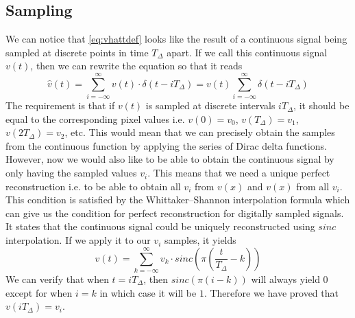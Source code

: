 \documentclass[a4paper,12pt,twoside,openright]{report}
\begin{document}
\subsection{Sampling}
We can notice that \ref{eq:vhattdef} looks like the result of a continuous signal being sampled at discrete points in time $T_{\Delta}$ apart. If we call this continuous signal $v(t)$, then we can rewrite the equation so that it reads
\begin{equation}
\hat{v}(t) = \sum\limits_{i=-\infty}^{\infty} v(t) \cdot \delta(t-i T_{\Delta}) = v(t) \sum\limits_{i=-\infty}^{\infty} \delta(t-i T_{\Delta})
\end{equation}
The requirement is that if $v(t)$ is sampled at discrete intervals $i T_{\Delta}$, it should be equal to the corresponding pixel values i.e. $v(0)=v_{0}$, $v(T_{\Delta})=v_{1}$, $v(2 T_{\Delta})=v_{2}$, etc. This would mean that we can precisely obtain the samples from the continuous function by applying the series of Dirac delta functions. However, now we would also like to be able to obtain the continuous signal by only having the sampled values $v_{i}$. This means that we need a unique perfect reconstruction i.e. to be able to obtain all $v_{i}$ from $v(x)$ and $v(x)$ from all $v_{i}$. This condition is satisfied by the Whittaker--Shannon interpolation formula which can give us the condition for perfect reconstruction for digitally sampled signals. It states that the continuous signal could be uniquely reconstructed using $sinc$ interpolation. If we apply it to our $v_{i}$ samples, it yields
\begin{equation}
v(t) = \sum\limits_{k=-\infty}^{\infty} v_{k} \cdot sinc ( \pi \left( \frac{t}{T_{\Delta}} - k \right) )
\end{equation}
We can verify that when $t=i T_{\Delta}$, then $sinc(\pi (i-k) )$ will always yield $0$ except for when $i = k$ in which case it will be $1$. Therefore we have proved that $v(i T_{\Delta}) = v_{i}$.
\end{document}
